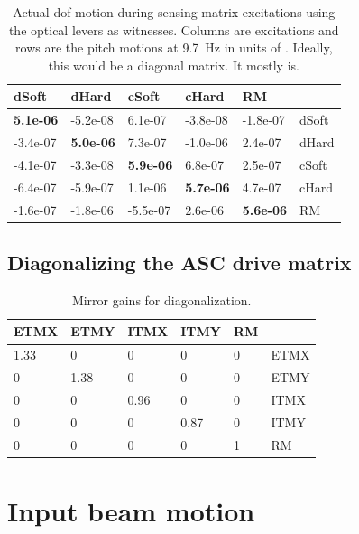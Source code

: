 \begin{table}
\centering
\caption{Actual dof motion during sensing matrix excitations using the
  optical levers as witnesses. Columns are excitations and rows are
  the pitch motions at 9.7~Hz in units of \microrad. Ideally, this
  would be a diagonal matrix. It mostly is.}
\begin{tabular}{l l l l l l}
\hline
dSoft & dHard  & cSoft & cHard & RM & \\
\hline
   \textbf{5.1e-06} & -5.2e-08  & 6.1e-07 & -3.8e-08 &  -1.8e-07 & dSoft\\
  -3.4e-07 &  \textbf{5.0e-06}  &  7.3e-07 & -1.0e-06 &  2.4e-07 & dHard\\
  -4.1e-07 & -3.3e-08 &  \textbf{5.9e-06} &  6.8e-07 &  2.5e-07 & cSoft\\
  -6.4e-07 & -5.9e-07 &  1.1e-06 &  \textbf{5.7e-06} &  4.7e-07 & cHard\\
  -1.6e-07 & -1.8e-06 & -5.5e-07 &   2.6e-06 &  \textbf{5.6e-06} & RM\\
\hline
\end{tabular}
\label{table:excitations_calibrated}
\end{table}





\subsection{Diagonalizing the ASC drive matrix}

\begin{table}
\centering
\caption{Mirror gains for diagonalization.}
\begin{tabular}{l l l l l l}
ETMX & ETMY & ITMX & ITMY & RM & \\
\hline\hline
1.33 & 0 & 0 & 0 & 0 & ETMX\\
0 & 1.38 & 0 & 0 & 0 & ETMY \\
0 & 0 & 0.96 & 0 & 0 & ITMX\\
0 & 0 & 0 & 0.87 & 0 & ITMY\\
 0 & 0 & 0 & 0 & 1 & RM\\
\hline
\end{tabular}
\end{table}








\section{Input beam motion}

